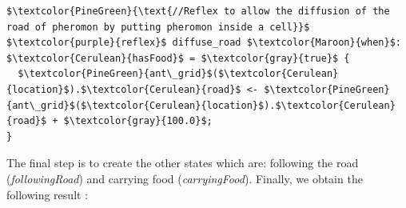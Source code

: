 \documentclass[12pt, a4paper]{memoir} %
\begin{document}
			\begin{lstlisting}[mathescape,caption=Finite State Machine exemple.,label=code:fsm]
$\textcolor{PineGreen}{\text{//Reflex to allow the diffusion of the road of pheromon by putting pheromon inside a cell}}$
$\textcolor{purple}{reflex}$ diffuse_road $\textcolor{Maroon}{when}$: $\textcolor{Cerulean}{hasFood}$ = $\textcolor{gray}{true}$ {
  $\textcolor{PineGreen}{ant\_grid}$($\textcolor{Cerulean}{location}$).$\textcolor{Cerulean}{road}$ <- $\textcolor{PineGreen}{ant\_grid}$($\textcolor{Cerulean}{location}$).$\textcolor{Cerulean}{road}$ + $\textcolor{gray}{100.0}$;
}
			\end{lstlisting}

			The final step is to create the other states which are: following the road (\textit{followingRoad}) and carrying food (\textit{carryingFood}).
			Finally, we obtain the following result :
\end{document}
